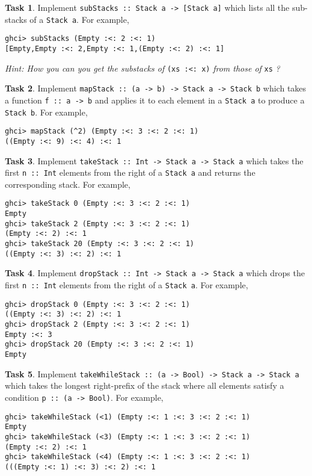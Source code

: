 \documentclass{article}[12pt]
\theoremstyle{definition}
\newtheorem{task}{Task}
\begin{document}
\begin{task}
    Implement \verb|subStacks :: Stack a -> [Stack a]| which lists all the sub-stacks of a \verb|Stack a|. For example,
    \begin{verbatim}
ghci> subStacks (Empty :<: 2 :<: 1)
[Empty,Empty :<: 2,Empty :<: 1,(Empty :<: 2) :<: 1]\end{verbatim}
    \emph{Hint: How you can you get the substacks of} \verb|(xs :<: x)| \emph{from those of} \verb|xs| \emph{?}
\end{task}

\begin{task}
    Implement \verb|mapStack :: (a -> b) -> Stack a -> Stack b| which takes a function \verb|f :: a -> b| and applies it to each element in a \verb|Stack a| to produce a \verb|Stack b|. For example,
    \begin{verbatim}
ghci> mapStack (^2) (Empty :<: 3 :<: 2 :<: 1)
((Empty :<: 9) :<: 4) :<: 1\end{verbatim}
\end{task}

\begin{task}
    Implement \verb|takeStack :: Int -> Stack a -> Stack a| which takes the first \verb|n :: Int| elements from the right of a \verb|Stack a| and returns the corresponding stack. For example,
    \begin{verbatim}
ghci> takeStack 0 (Empty :<: 3 :<: 2 :<: 1)
Empty     
ghci> takeStack 2 (Empty :<: 3 :<: 2 :<: 1)
(Empty :<: 2) :<: 1
ghci> takeStack 20 (Empty :<: 3 :<: 2 :<: 1)
((Empty :<: 3) :<: 2) :<: 1\end{verbatim}
\end{task}

\begin{task}
    Implement \verb|dropStack :: Int -> Stack a -> Stack a| which drops the first \verb|n :: Int| elements from the right of a \verb|Stack a|. For example,
    \begin{verbatim}
ghci> dropStack 0 (Empty :<: 3 :<: 2 :<: 1)
((Empty :<: 3) :<: 2) :<: 1
ghci> dropStack 2 (Empty :<: 3 :<: 2 :<: 1)
Empty :<: 3
ghci> dropStack 20 (Empty :<: 3 :<: 2 :<: 1)
Empty\end{verbatim}
\end{task}

\begin{task}
    Implement \verb|takeWhileStack :: (a -> Bool) -> Stack a -> Stack a| which takes the longest right-prefix of the stack where all elements satisfy a condition \verb|p :: (a -> Bool)|.  For example,
    \begin{verbatim}
ghci> takeWhileStack (<1) (Empty :<: 1 :<: 3 :<: 2 :<: 1)
Empty
ghci> takeWhileStack (<3) (Empty :<: 1 :<: 3 :<: 2 :<: 1)
(Empty :<: 2) :<: 1
ghci> takeWhileStack (<4) (Empty :<: 1 :<: 3 :<: 2 :<: 1)
(((Empty :<: 1) :<: 3) :<: 2) :<: 1\end{verbatim}
\end{task}
\end{document}

